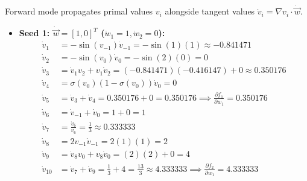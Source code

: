 \documentclass[11pt,english]{article}
\begin{document}
\begin{enumerate}[resume]
Forward mode propagates primal values $v_i$ alongside tangent values $\dot{v}_i = \nabla v_i \cdot \dot{\vec{w}}$.
\begin{itemize}
    \item \textbf{Seed 1: $\dot{\vec{w}} = [1, 0]^T$ ($\dot{w}_1 = 1, \dot{w}_2 = 0$):}
    \begin{align*}
        \dot{v}_1 &= -\sin(v_{-1})\dot{v}_{-1} = -\sin(1)(1) \approx -0.841471 \\
        \dot{v}_2 &= -\sin(v_0)\dot{v}_0 = -\sin(2)(0) = 0 \\
        \dot{v}_3 &= \dot{v}_1 v_2 + v_1 \dot{v}_2 = (-0.841471)(-0.416147) + 0 \approx 0.350176 \\
        \dot{v}_4 &= \sigma(v_0)(1-\sigma(v_0))\dot{v}_0 = 0 \\
        \dot{v}_5 &= \dot{v}_3 + \dot{v}_4 = 0.350176 + 0 = 0.350176 \implies \frac{\partial f_1}{\partial w_1} = 0.350176 \\
        \dot{v}_6 &= \dot{v}_{-1} + \dot{v}_0 = 1 + 0 = 1 \\
        \dot{v}_7 &= \frac{\dot{v}_6}{v_6} = \frac{1}{3} \approx 0.333333 \\
        \dot{v}_8 &= 2 v_{-1} \dot{v}_{-1} = 2(1)(1) = 2 \\
        \dot{v}_9 &= \dot{v}_8 v_0 + v_8 \dot{v}_0 = (2)(2) + 0 = 4 \\
        \dot{v}_{10} &= \dot{v}_7 + \dot{v}_9 = \frac{1}{3} + 4 = \frac{13}{3} \approx 4.333333 \implies \frac{\partial f_2}{\partial w_1} = 4.333333
    \end{align*}
    

\end{itemize}
\end{enumerate}
\end{document}
